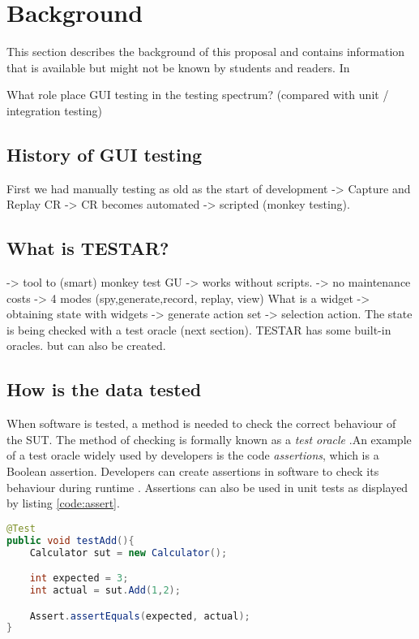 \section{Background} \label{background}
    This section describes the background of this proposal and contains information that is available but might not be known by students and readers. In
    
    What role place GUI testing in the testing spectrum? (compared with unit / integration testing)

\subsection{History of GUI testing}

    First we had manually testing as old as the start of development -> Capture and Replay CR -> CR becomes automated -> scripted (monkey testing).

\subsection{What is TESTAR?}
    -> tool to (smart) monkey test GU -> works without scripts. -> no maintenance costs -> 4 modes (spy,generate,record, replay, view)
    What is a widget -> obtaining state with widgets -> generate action set -> selection action.
    The state is being checked with a test oracle (next section). TESTAR has some built-in oracles. but can also be created.



\subsection{How is the data tested}
    When software is tested, a method is needed to check the correct behaviour of the SUT. The method of checking is formally known as a \emph{test oracle} \cite{testOracles}.An example of a test oracle widely used by developers is the code \emph{assertions}, which is a Boolean assertion. Developers can create assertions in software to check its behaviour during runtime \cite{barr2014oracle}. Assertions can also be used in unit tests as displayed by listing \ref{code:assert}. 

\begin{lstlisting}[language=Java, caption=Assertion, label=code:assert]
@Test
public void testAdd(){
    Calculator sut = new Calculator();

    int expected = 3;
    int actual = sut.Add(1,2);

    Assert.assertEquals(expected, actual);
}
\end{lstlisting}


